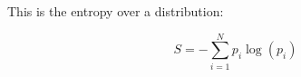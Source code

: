 \documentclass{article}
\begin{document}
This is the entropy over a distribution:

$$S = - \sum_{i=1}^{N} p_i \log(p_i)$$
\end{document}
